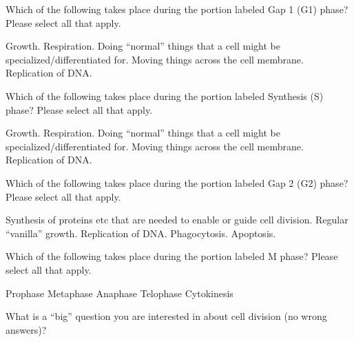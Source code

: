 \documentclass[quiz,addpoints,noanswers]{exam}
\begin{document}
\begin{questions}
\question[1] Which of the following takes place during the portion labeled Gap 1 (G1) phase? Please select all that apply. 
\begin{choices}
\CorrectChoice Growth.
\CorrectChoice Respiration.
\CorrectChoice Doing ``normal'' things that a cell might be specialized/differentiated for.
\CorrectChoice Moving things across the cell membrane. 
\choice Replication of DNA. 
\end{choices}

\question[1] Which of the following takes place during the portion labeled Synthesis (S) phase? Please select all that apply. 
\begin{choices}
\CorrectChoice Growth.
\CorrectChoice Respiration.
\CorrectChoice Doing ``normal'' things that a cell might be specialized/differentiated for.
\CorrectChoice Moving things across the cell membrane. 
\choice Replication of DNA. 
\end{choices}

\question[1] Which of the following takes place during the portion labeled Gap 2 (G2) phase? Please select all that apply. 
\begin{choices}
\CorrectChoice Synthesis of proteins etc that are needed to enable or guide cell division.
\choice Regular ``vanilla'' growth.
\choice Replication of DNA.
\choice Phagocytosis.
\choice Apoptosis.  
\end{choices}

\clearpage
\question[1] Which of the following takes place during the portion labeled M phase? Please select all that apply. 
\begin{choices}
\CorrectChoice Prophase
\CorrectChoice Metaphase
\CorrectChoice Anaphase
\CorrectChoice Telophase
\CorrectChoice Cytokinesis
\end{choices}

\question[1]  What is a ``big'' question you are interested in about cell division (no wrong answers)? 
\begin{solution}[1in]
\end{solution}

\end{questions}
\end{document}
